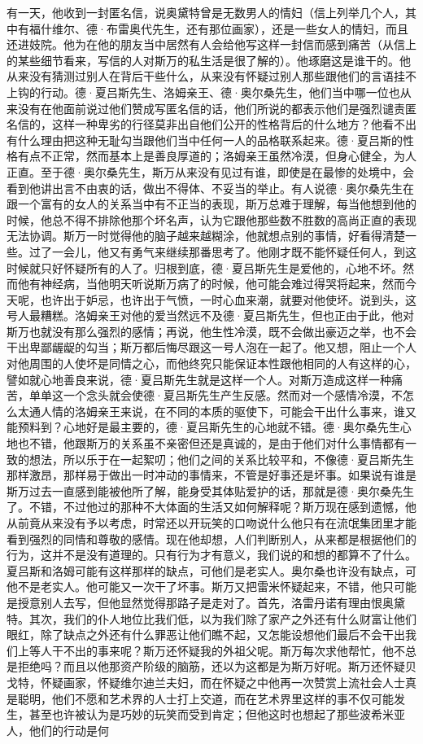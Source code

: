 \par 有一天，他收到一封匿名信，说奥黛特曾是无数男人的情妇（信上列举几个人，其中有福什维尔、德·布雷奥代先生，还有那位画家），还是一些女人的情妇，而且还进妓院。他为在他的朋友当中居然有人会给他写这样一封信而感到痛苦（从信上的某些细节看来，写信的人对斯万的私生活是很了解的）。他琢磨这是谁干的。他从来没有猜测过别人在背后干些什么，从来没有怀疑过别人那些跟他们的言语挂不上钩的行动。德·夏吕斯先生、洛姆亲王、德·奥尔桑先生，他们当中哪一位也从来没有在他面前说过他们赞成写匿名信的话，他们所说的都表示他们是强烈谴责匿名信的，这样一种卑劣的行径莫非出自他们公开的性格背后的什么地方？他看不出有什么理由把这种无耻勾当跟他们当中任何一人的品格联系起来。德·夏吕斯的性格有点不正常，然而基本上是善良厚道的；洛姆亲王虽然冷漠，但身心健全，为人正直。至于德·奥尔桑先生，斯万从来没有见过有谁，即使是在最惨的处境中，会看到他讲出言不由衷的话，做出不得体、不妥当的举止。有人说德·奥尔桑先生在跟一个富有的女人的关系当中有不正当的表现，斯万总难于理解，每当他想到他的时候，他总不得不排除他那个坏名声，认为它跟他那些数不胜数的高尚正直的表现无法协调。斯万一时觉得他的脑子越来越糊涂，他就想点别的事情，好看得清楚一些。过了一会儿，他又有勇气来继续那番思考了。他刚才既不能怀疑任何人，到这时候就只好怀疑所有的人了。归根到底，德·夏吕斯先生是爱他的，心地不坏。然而他有神经病，当他明天听说斯万病了的时候，他可能会难过得哭将起来，然而今天呢，也许出于妒忌，也许出于气愤，一时心血来潮，就要对他使坏。说到头，这号人最糟糕。洛姆亲王对他的爱当然远不及德·夏吕斯先生，但也正由于此，他对斯万也就没有那么强烈的感情；再说，他生性冷漠，既不会做出豪迈之举，也不会干出卑鄙龌龊的勾当；斯万都后悔尽跟这一号人泡在一起了。他又想，阻止一个人对他周围的人使坏是同情之心，而他终究只能保证本性跟他相同的人有这样的心，譬如就心地善良来说，德·夏吕斯先生就是这样一个人。对斯万造成这样一种痛苦，单单这一个念头就会使德·夏吕斯先生产生反感。然而对一个感情冷漠，不怎么太通人情的洛姆亲王来说，在不同的本质的驱使下，可能会干出什么事来，谁又能预料到？心地好是最主要的，德·夏吕斯先生的心地就不错。德·奥尔桑先生心地也不错，他跟斯万的关系虽不亲密但还是真诚的，是由于他们对什么事情都有一致的想法，所以乐于在一起絮叨；他们之间的关系比较平和，不像德·夏吕斯先生那样激昂，那样易于做出一时冲动的事情来，不管是好事还是坏事。如果说有谁是斯万过去一直感到能被他所了解，能身受其体贴爱护的话，那就是德·奥尔桑先生了。不错，不过他过的那种不大体面的生活又如何解释呢？斯万现在感到遗憾，他从前竟从来没有予以考虑，时常还以开玩笑的口吻说什么他只有在流氓集团里才能看到强烈的同情和尊敬的感情。现在他却想，人们判断别人，从来都是根据他们的行为，这并不是没有道理的。只有行为才有意义，我们说的和想的都算不了什么。夏吕斯和洛姆可能有这样那样的缺点，可他们是老实人。奥尔桑也许没有缺点，可他不是老实人。他可能又一次干了坏事。斯万又把雷米怀疑起来，不错，他只可能是授意别人去写，但他显然觉得那路子是走对了。首先，洛雷丹诺有理由恨奥黛特。其次，我们的仆人地位比我们低，以为我们除了家产之外还有什么财富让他们眼红，除了缺点之外还有什么罪恶让他们瞧不起，又怎能设想他们最后不会干出我们上等人干不出的事来呢？斯万还怀疑我的外祖父呢。斯万每次求他帮忙，他不总是拒绝吗？而且以他那资产阶级的脑筋，还以为这都是为斯万好呢。斯万还怀疑贝戈特，怀疑画家，怀疑维尔迪兰夫妇，而在怀疑之中他再一次赞赏上流社会人士真是聪明，他们不愿和艺术界的人士打上交道，而在艺术界里这样的事不仅可能发生，甚至也许被认为是巧妙的玩笑而受到肯定；但他这时也想起了那些波希米亚人，他们的行动是何